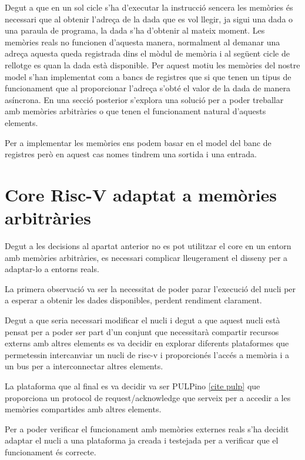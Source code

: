\documentclass[10pt,a4paper,twocolumn,twoside]{article}
\begin{document}
    Degut a que en un sol cicle s'ha d'executar la instrucció sencera les memòries és necessari que al obtenir l'adreça de la dada que es vol llegir, ja sigui una dada o una paraula de programa, la dada s'ha d'obtenir al mateix moment. Les memòries reals no funcionen d'aquesta manera, normalment al demanar una adreça aquesta queda registrada dins el mòdul de memòria i al següent cicle de rellotge es quan la dada està disponible. Per aquest motiu les memòries del nostre model s'han implementat com a bancs de registres que si que tenen un tipus de funcionament que al proporcionar l'adreça s'obté el valor de la dada de manera asíncrona. En una secció posterior s'explora una solució per a poder treballar amb memòries arbitràries o que tenen el funcionament natural d'aquests elements.
    
    Per a implementar les memòries ens podem basar en el model del banc de registres però en aquest cas nomes tindrem una sortida i una entrada.

        
        
\section{Core Risc-V adaptat a memòries arbitràries}
    Degut a les decisions al apartat anterior no es pot utilitzar el core en un entorn amb memòries arbitràries, es necessari complicar lleugerament el disseny per a adaptar-lo a entorns reals. 
    
    La primera observació va ser la necessitat de poder parar l'execució del nucli per a esperar a obtenir les dades disponibles, perdent rendiment clarament.
    
    Degut a que seria necessari modificar el nucli i degut a que aquest nucli està pensat per a poder ser part d'un conjunt que necessitarà compartir recursos externs amb altres elements es va decidir en explorar diferents plataformes que permetessin intercanviar un nucli de risc-v i proporcionés l'accés a memòria i a un bus per a interconnectar altres elements.
    
    La plataforma que al final es va decidir va ser PULPino \ref{cite pulp} que proporciona un protocol de request/acknowledge que serveix per a accedir a les memòries compartides amb altres elements. 
    
    Per a poder verificar el funcionament amb memòries externes reals s'ha decidit adaptar el nucli a una plataforma ja creada i testejada per a verificar que el funcionament és correcte.
    
\end{document}
